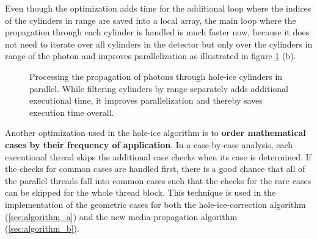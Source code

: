 Even though the optimization adds time for the additional loop where the indices of the cylinders in range are saved into a local array, the main loop where the propagation through each cylinder is handled is much faster now, because it does not need to iterate over all cylinders in the detector but only over the cylinders in range of the photon and improves parallelization as illustrated in figure \ref{fig:ceiV8Yai} (b).


\begin{figure}[htbp]
  \hfill
  \caption{Processing the propagation of photons through hole-ice cylinders in parallel. While filtering cylinders by range separately adds additional executional time, it improves parallelization and thereby saves execution time overall.}
  \label{fig:ceiV8Yai}
\end{figure}


Another optimization used in the hole-ice algorithm is to \textbf{order mathematical cases by their frequency of application}. In a case-by-case analysis, each executional thread skips the additional case checks when its case is determined. If the checks for common cases are handled first, there is a good chance that all of the parallel threads fall into common cases such that the checks for the rare cases can be skipped for the whole thread block.
This technique is used in the implementation of the geometric cases for both the hole-ice-correction algorithm (\ref{sec:algorithm_a}) and the new media-propagation algorithm (\ref{sec:algorithm_b}).



